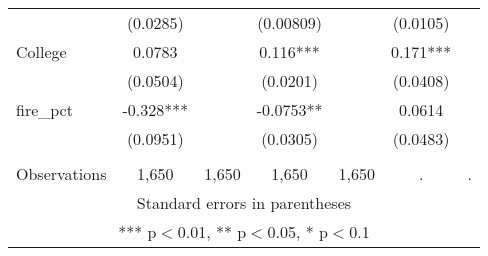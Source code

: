 \begin{tabular}{lcccccc}
 & (0.0285) &  & (0.00809) &  & (0.0105) &  \\
College & 0.0783 &  & 0.116*** &  & 0.171*** &  \\
 & (0.0504) &  & (0.0201) &  & (0.0408) &  \\
fire\_pct & -0.328*** &  & -0.0753** &  & 0.0614 &  \\
 & (0.0951) &  & (0.0305) &  & (0.0483) &  \\
 &  &  &  &  &  &  \\
 Observations & 1,650 & 1,650 & 1,650 & 1,650 & . & . \\ \hline
\multicolumn{7}{c}{ Standard errors in parentheses} \\
\multicolumn{7}{c}{ *** p$<$0.01, ** p$<$0.05, * p$<$0.1} \\
\end{tabular}
